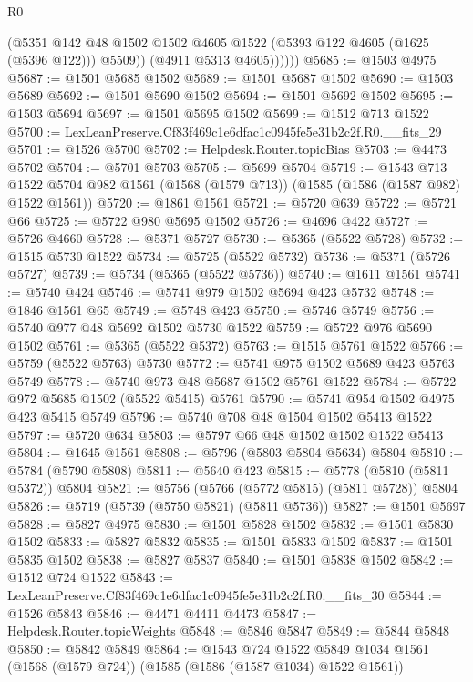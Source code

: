 \begin{lexlean}{R0}
\begin{coremodule}
                (@5351
                  @142
                  @48
                  @1502
                  @1502
                  @4605
                  @1522
                  (@5393 @122 @4605 (@1625 (@5396 @122)))
                  @5509))
              (@4911 @5313 @4605))))))
@5685 := @1503 @4975
@5687 := @1501 @5685 @1502
@5689 := @1501 @5687 @1502
@5690 := @1503 @5689
@5692 := @1501 @5690 @1502
@5694 := @1501 @5692 @1502
@5695 := @1503 @5694
@5697 := @1501 @5695 @1502
@5699 := @1512 @713 @1522
@5700 := LexLeanPreserve.Cf83f469c1e6dfac1c0945fe5e31b2c2f.R0.__fits_29
@5701 := @1526 @5700
@5702 := Helpdesk.Router.topicBias
@5703 := @4473 @5702
@5704 := @5701 @5703
@5705 := @5699 @5704
@5719 := @1543
    @713
    @1522
    @5704
    @982
    @1561
    (@1568 (@1579 @713))
    (@1585 (@1586 (@1587 @982) @1522 @1561))
@5720 := @1861 @1561
@5721 := @5720 @639
@5722 := @5721 @66
@5725 := @5722 @980 @5695 @1502
@5726 := @4696 @422
@5727 := @5726 @4660
@5728 := @5371 @5727
@5730 := @5365 (@5522 @5728)
@5732 := @1515 @5730 @1522
@5734 := @5725 (@5522 @5732)
@5736 := @5371 (@5726 @5727)
@5739 := @5734 (@5365 (@5522 @5736))
@5740 := @1611 @1561
@5741 := @5740 @424
@5746 := @5741 @979 @1502 @5694 @423 @5732
@5748 := @1846 @1561 @65
@5749 := @5748 @423
@5750 := @5746 @5749
@5756 := @5740 @977 @48 @5692 @1502 @5730 @1522
@5759 := @5722 @976 @5690 @1502
@5761 := @5365 (@5522 @5372)
@5763 := @1515 @5761 @1522
@5766 := @5759 (@5522 @5763) @5730
@5772 := @5741 @975 @1502 @5689 @423 @5763 @5749
@5778 := @5740 @973 @48 @5687 @1502 @5761 @1522
@5784 := @5722 @972 @5685 @1502 (@5522 @5415) @5761
@5790 := @5741 @954 @1502 @4975 @423 @5415 @5749
@5796 := @5740 @708 @48 @1504 @1502 @5413 @1522
@5797 := @5720 @634
@5803 := @5797 @66 @48 @1502 @1502 @1522 @5413
@5804 := @1645 @1561
@5808 := @5796 (@5803 @5804 @5634) @5804
@5810 := @5784 (@5790 @5808)
@5811 := @5640 @423
@5815 := @5778 (@5810 (@5811 @5372)) @5804
@5821 := @5756 (@5766 (@5772 @5815) (@5811 @5728)) @5804
@5826 := @5719 (@5739 (@5750 @5821) (@5811 @5736))
@5827 := @1501 @5697
@5828 := @5827 @4975
@5830 := @1501 @5828 @1502
@5832 := @1501 @5830 @1502
@5833 := @5827 @5832
@5835 := @1501 @5833 @1502
@5837 := @1501 @5835 @1502
@5838 := @5827 @5837
@5840 := @1501 @5838 @1502
@5842 := @1512 @724 @1522
@5843 := LexLeanPreserve.Cf83f469c1e6dfac1c0945fe5e31b2c2f.R0.__fits_30
@5844 := @1526 @5843
@5846 := @4471 @4411 @4473
@5847 := Helpdesk.Router.topicWeights
@5848 := @5846 @5847
@5849 := @5844 @5848
@5850 := @5842 @5849
@5864 := @1543
    @724
    @1522
    @5849
    @1034
    @1561
    (@1568 (@1579 @724))
    (@1585 (@1586 (@1587 @1034) @1522 @1561))

\end{coremodule}
\end{lexlean}
